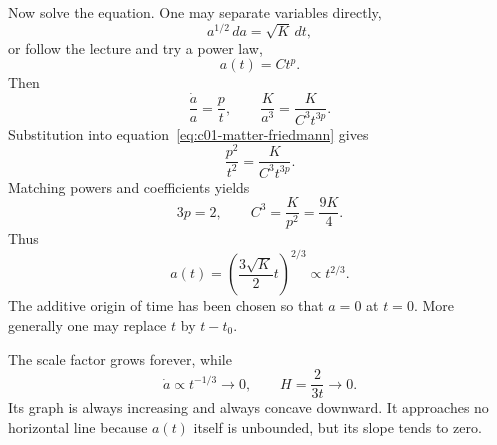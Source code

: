 Now solve the equation. One may separate variables directly,
\begin{equation}
a^{1/2}\,da=\sqrt{K}\,dt,
\end{equation}
or follow the lecture and try a power law,
\begin{equation}
a(t)=Ct^p.
\label{eq:c01-power-trial}
\end{equation}
Then
\begin{equation}
\frac{\dot a}{a}=\frac{p}{t},
\qquad
\frac{K}{a^3}=\frac{K}{C^3t^{3p}}.
\end{equation}
Substitution into equation~\eqref{eq:c01-matter-friedmann} gives
\begin{equation}
\frac{p^2}{t^2}=\frac{K}{C^3t^{3p}}.
\end{equation}
Matching powers and coefficients yields
\begin{equation}
3p=2,
\qquad
C^3=\frac{K}{p^2}=\frac{9K}{4}.
\end{equation}
Thus
\begin{equation}
\boxed{
a(t)=\left(\frac{3\sqrt K}{2}t\right)^{2/3}\propto t^{2/3}.
}
\label{eq:c01-two-thirds}
\end{equation}
The additive origin of time has been chosen so that \(a=0\) at \(t=0\). More generally one may replace \(t\) by \(t-t_0\).

The scale factor grows forever, while
\begin{equation}
\dot a\propto t^{-1/3}\longrightarrow0,
\qquad
H=\frac{2}{3t}\longrightarrow0.
\label{eq:c01-asymptotic-slope}
\end{equation}
Its graph is always increasing and always concave downward. It approaches no horizontal line because \(a(t)\) itself is unbounded, but its slope tends to zero.

\begin{classroomqa}
\end{classroomqa}

\begin{classroomqa}
\end{classroomqa}

